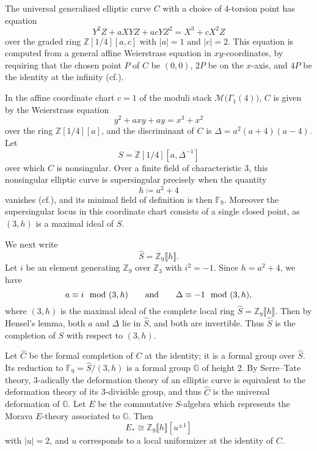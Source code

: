 \documentclass{gtpart}
\theoremstyle{definition}
\theoremstyle{remark}
\newcommand{\mb}[1]{\mathbb{#1}}
\newcommand{\cf}{cf.\thinspace}
\newcommand{\BF}{{\mb F}}
\newcommand{\BG}{{\mb G}}
\newcommand{\BZ}{{\mb Z}}
\newcommand{\HC}{\widehat{C}}
\newcommand{\HS}{\widehat{S}}
\newcommand{\md}{~~{\rm mod}~}
\newcommand{\ad}{{\rm and}}
\newcommand{\G}{\Gamma}
\newcommand{\CM}{{\mathscr{M}}}
\begin{document}
The universal generalized elliptic curve $C$ with a choice of 4-torsion point has equation 
\[
 Y^2 Z + a X Y Z + a c Y Z^2 = X^3 + c X^2 Z 
\]
over the graded ring $\BZ [1/4] [a,c]$ with $|a| = 1$ and $|c| = 2$.  
This equation is computed from a general affine Weierstrass equation in $xy$-coordinates, 
by requiring that the chosen point $P$ of $C$ be $(0,0)$, $2P$ be on the $x$-axis, and $4P$ be the identity at the infinity (\cf \cite[4(4.6a)]{ec}).  

In the affine coordinate chart $c = 1$ of the moduli stack $\CM \big(\G_1(4)\big)$, 
$C$ is given by the Weierstrass equation 
\begin{equation}
\label{Cxy}
 y^2 + a x y + a y = x^3 + x^2 
\end{equation}
over the ring $\BZ [1/4] [a]$, and the discriminant of $C$ is $\Delta = a^2 (a + 4) (a - 4)$.  
Let 
\begin{equation}
\label{S}
 S = \BZ [1/4] [a, \Delta^{-1}] 
\end{equation}
over which $C$ is nonsingular.  
Over a finite field of characteristic 3, this nonsingular elliptic curve is supersingular precisely when the quantity 
\begin{equation}
\label{h}
 h \coloneqq a^2 + 4 
\end{equation}
vanishes (\cf \cite[V.4.1a]{AEC}), and its minimal field of definition is then $\BF_9$.  
Moreover the supersingular locus in this coordinate chart consists of a single closed point, as $(3,h)$ is a maximal ideal of $S$.  

We next write 
\[
 \HS = \BZ_9 \llbracket h \rrbracket.  
\]
Let $i$ be an element generating $\BZ_9$ over $\BZ_3$ with $i^2 = -1$.  
Since $h = a^2 + 4$, we have 
\[
 a \equiv i \md (3,h) \qquad \ad \qquad \Delta \equiv -1 \md (3,h), 
\]
where $(3,h)$ is the maximal ideal of the complete local ring $\HS = \BZ_9 \llbracket h \rrbracket$.  
Then by Hensel's lemma, both $a$ and $\Delta$ lie in $\HS$, and both are invertible.  
Thus $\HS$ is the completion of $S$ with respect to $(3,h)$.  

Let $\HC$ be the formal completion of $C$ at the identity; it is a formal group over $\HS$.  
Its reduction to $\BF_9 = \HS / (3,h)$ is a formal group $\BG$ of height 2.  
By Serre--Tate theory, 3-adically the deformation theory of an elliptic curve is equivalent to the deformation theory of its 3-divisible group, 
and thus $\HC$ is the universal deformation of $\BG$.  
Let $E$ be the commutative $S$-algebra which represents the Morava $E$-theory associated to $\BG$.  Then 
\[
 E_* \cong \BZ_9 \llbracket h \rrbracket [u^{\pm 1}] 
\]
with $|u| = 2$, and $u$ corresponds to a local uniformizer at the identity of $C$.  
\end{document}
